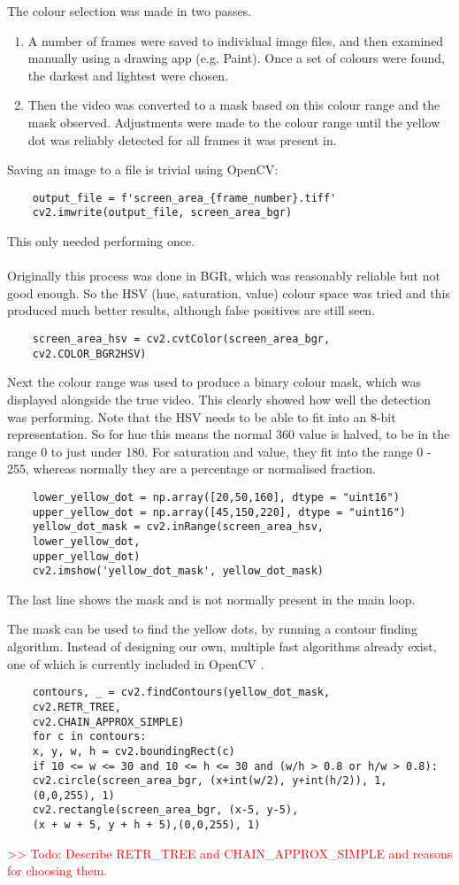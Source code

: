 \documentclass[final]{cmpreport_02}
\begin{document}
The colour selection was made in two passes.
\begin{enumerate}
	\item A number of frames were saved to individual image files, and then examined manually using a drawing app (e.g. Paint). Once a set of colours were found, the darkest and lightest were chosen.
	\item Then the video was converted to a mask based on this colour range and the mask observed. Adjustments were made to the colour range until the yellow dot was reliably detected for all frames it was present in.
\end{enumerate}
\noindent
Saving an image to a file is trivial using OpenCV:
\begin{verbatim}
	output_file = f'screen_area_{frame_number}.tiff'
	cv2.imwrite(output_file, screen_area_bgr)
\end{verbatim}
This only needed performing once.
\\\\
Originally this process was done in BGR, which was reasonably reliable but not good enough. So the HSV (hue, saturation, value) colour space was tried and this produced much better results, although false positives are still seen.
\begin{verbatim}
	screen_area_hsv = cv2.cvtColor(screen_area_bgr,
	cv2.COLOR_BGR2HSV)
\end{verbatim}
Next the colour range was used to produce a binary colour mask, which was displayed alongside the true video. This clearly showed how well the detection was performing. Note that the HSV needs to be able to fit into an 8-bit representation. So for hue this means the normal 360 value is halved, to be in the range 0 to just under 180. For saturation and value, they fit into the range 0 - 255, whereas normally they are a percentage or normalised fraction.
\begin{verbatim}
	lower_yellow_dot = np.array([20,50,160], dtype = "uint16")
	upper_yellow_dot = np.array([45,150,220], dtype = "uint16")
	yellow_dot_mask = cv2.inRange(screen_area_hsv,
	lower_yellow_dot,
	upper_yellow_dot)
	cv2.imshow('yellow_dot_mask', yellow_dot_mask)
\end{verbatim}
\noindent
The last line shows the mask and is not normally present in the main loop.

The mask can be used to find the yellow dots, by running a contour finding algorithm. Instead of designing our own, multiple fast algorithms already exist, one of which is currently included in OpenCV \citep{SUZUKI198532}.
\begin{verbatim}
	contours, _ = cv2.findContours(yellow_dot_mask,
	cv2.RETR_TREE,
	cv2.CHAIN_APPROX_SIMPLE)
	for c in contours:
	x, y, w, h = cv2.boundingRect(c)
	if 10 <= w <= 30 and 10 <= h <= 30 and (w/h > 0.8 or h/w > 0.8):
	cv2.circle(screen_area_bgr, (x+int(w/2), y+int(h/2)), 1,
	(0,0,255), 1)
	cv2.rectangle(screen_area_bgr, (x-5, y-5),
	(x + w + 5, y + h + 5),(0,0,255), 1)
\end{verbatim}
\textcolor{red}{>> Todo: Describe RETR\_TREE and CHAIN\_APPROX\_SIMPLE and reasons for choosing them.}\\
\end{document}
